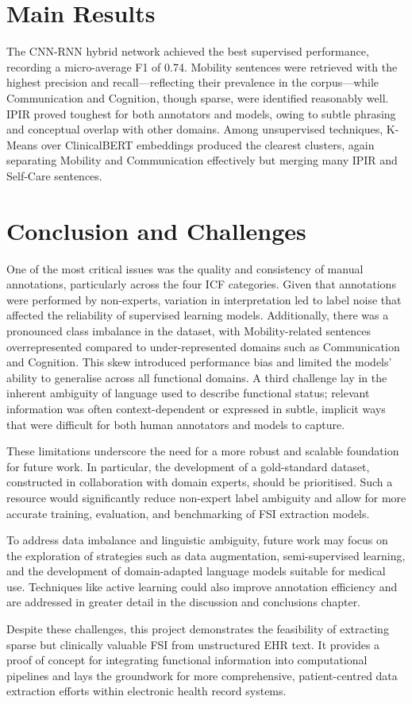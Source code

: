 \section{Main Results}
The CNN-RNN hybrid network achieved the best supervised performance, recording a micro-average F1 of 0.74. Mobility sentences were retrieved with the highest precision and recall—reflecting their prevalence in the corpus—while Communication and Cognition, though sparse, were identified reasonably well. IPIR proved toughest for both annotators and models, owing to subtle phrasing and conceptual overlap with other domains. Among unsupervised techniques, K-Means over ClinicalBERT embeddings produced the clearest clusters, again separating Mobility and Communication effectively but merging many IPIR and Self-Care sentences. \medskip

\section{Conclusion and Challenges}
One of the most critical issues was the quality and consistency of manual annotations, particularly across the four ICF categories. Given that annotations were performed by non-experts, variation in interpretation led to label noise that affected the reliability of supervised learning models. Additionally, there was a pronounced class imbalance in the dataset, with Mobility-related sentences overrepresented compared to under-represented domains such as Communication and Cognition. This skew introduced performance bias and limited the models’ ability to generalise across all functional domains. A third challenge lay in the inherent ambiguity of language used to describe functional status; relevant information was often context-dependent or expressed in subtle, implicit ways that were difficult for both human annotators and models to capture. \medskip

These limitations underscore the need for a more robust and scalable foundation for future work. In particular, the development of a gold-standard dataset, constructed in collaboration with domain experts, should be prioritised. Such a resource would significantly reduce non-expert label ambiguity and allow for more accurate training, evaluation, and benchmarking of FSI extraction models. \medskip

To address data imbalance and linguistic ambiguity, future work may focus on the exploration of strategies such as data augmentation, semi-supervised learning, and the development of domain-adapted language models suitable for medical use. Techniques like active learning could also improve annotation efficiency and are addressed in greater detail in the discussion and conclusions chapter.\medskip

Despite these challenges, this project demonstrates the feasibility of extracting sparse but clinically valuable FSI from unstructured EHR text. It provides a proof of concept for integrating functional information into computational pipelines and lays the groundwork for more comprehensive, patient-centred data extraction efforts within electronic health record systems.
